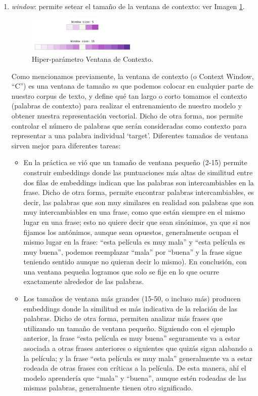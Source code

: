 \documentclass[12pt,a4paper]{article}
\begin{document}
\begin{sloppypar}
\begin{enumerate}
\item \textit{window}: permite setear el tamaño de la ventana de contexto: ver Imagen \ref{fig:5_Window}.

\begin{figure}[H] 
 \centering
 \includegraphics[width=0.5\textwidth]{images/implementacion_5/5_Window.png}
\captionsetup{justification=centering,margin=2cm}
 \caption{Hiper-parámetro Ventana de Contexto\cite{datitos_nlp}.}
 \label{fig:5_Window}
\end{figure}

Como mencionamos previamente, la ventana de contexto (o Context Window, “C”) es una ventana de tamaño $m$ que podemos colocar en cualquier parte de nuestro corpus de texto, y define qué tan largo o corto tomamos el contexto (palabras de contexto) para realizar el entrenamiento de nuestro modelo y obtener nuestra representación vectorial\cite{NLP_26}. Dicho de otra forma, nos permite controlar el número de palabras que serán consideradas como contexto para representar a una palabra individual ‘target’. Diferentes tamaños de ventana sirven mejor para diferentes tareas\cite{datitos_nlp}:
\begin{itemize}
\item En la práctica se vió que un tamaño de ventana pequeño (2-15) permite construir embeddings donde las puntuaciones más altas de similitud entre dos filas de embeddings indican que las palabras son intercambiables en la frase. Dicho de otra forma, permite encontrar palabras intercambiables, es decir, las palabras que son muy similares en realidad son palabras que son muy intercambiables en una frase, como que están siempre en el mismo lugar en una frase; esto no quiere decir que sean sinónimos, ya que si nos fijamos los antónimos, aunque sean opuestos, generalmente ocupan el mismo lugar en la frase: “esta película es muy mala” y “esta película es muy buena”, podemos reemplazar “mala” por “buena” y la frase sigue teniendo sentido aunque no quieran decir lo mismo). En conclusión, con una ventana pequeña logramos que solo se fije en lo que ocurre exactamente alrededor de las palabras. 
\item Los tamaños de ventana más grandes (15-50, o incluso más) producen embeddings donde la similitud es más indicativa de la relación de las palabras. Dicho de otra forma, permiten analizar más frases que utilizando un tamaño de ventana pequeño. Siguiendo con el ejemplo anterior, la frase “esta película es muy buena” seguramente va a estar asociada a otras frases anteriores o siguientes que quizás sigan alabando a la película; y la frase “esta película es muy mala” generalmente va a estar rodeada de otras frases con críticas a la película. De esta manera, ahí el modelo aprendería que “mala” y “buena”, aunque estén rodeadas de las mismas palabras, generalmente tienen otro significado. 
\end{itemize}


\end{enumerate}
\end{sloppypar}
\end{document}
